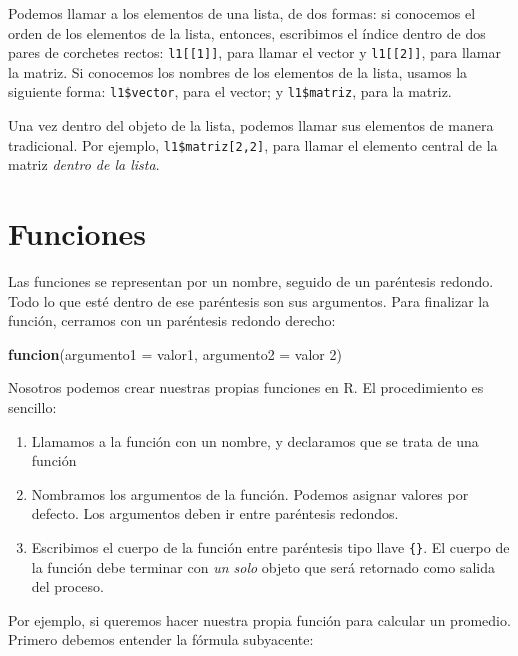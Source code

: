 \documentclass[12pt,letterpaper,]{book}
\newenvironment{Shaded}{\begin{snugshade}}{\end{snugshade}}
\newcommand{\KeywordTok}[1]{\textcolor[rgb]{0.13,0.29,0.53}{\textbf{#1}}}
\newcommand{\DataTypeTok}[1]{\textcolor[rgb]{0.13,0.29,0.53}{#1}}
\newcommand{\DecValTok}[1]{\textcolor[rgb]{0.00,0.00,0.81}{#1}}
\newcommand{\NormalTok}[1]{#1}
\begin{document}
Podemos llamar a los elementos de una lista, de dos formas: si conocemos
el orden de los elementos de la lista, entonces, escribimos el índice
dentro de dos pares de corchetes rectos: \texttt{l1{[}{[}1{]}{]}}, para
llamar el vector y \texttt{l1{[}{[}2{]}{]}}, para llamar la matriz. Si
conocemos los nombres de los elementos de la lista, usamos la siguiente
forma: \texttt{l1\$vector}, para el vector; y \texttt{l1\$matriz}, para
la matriz.

Una vez dentro del objeto de la lista, podemos llamar sus elementos de
manera tradicional. Por ejemplo, \texttt{l1\$matriz{[}2,2{]}}, para
llamar el elemento central de la matriz \emph{dentro de la lista}.

\section{Funciones}\label{funciones}

Las funciones se representan por un nombre, seguido de un paréntesis
redondo. Todo lo que esté dentro de ese paréntesis son sus argumentos.
Para finalizar la función, cerramos con un paréntesis redondo derecho:

\begin{Shaded}
\begin{Highlighting}[]
\KeywordTok{funcion}\NormalTok{(}\DataTypeTok{argumento1 =}\NormalTok{ valor1,  }\DataTypeTok{argumento2 =}\NormalTok{ valor }\DecValTok{2}\NormalTok{)}
\end{Highlighting}
\end{Shaded}

Nosotros podemos crear nuestras propias funciones en R. El procedimiento
es sencillo:

\begin{enumerate}
\def\labelenumi{\arabic{enumi}.}
\item
  Llamamos a la función con un nombre, y declaramos que se trata de una
  función
\item
  Nombramos los argumentos de la función. Podemos asignar valores por
  defecto. Los argumentos deben ir entre paréntesis redondos.
\item
  Escribimos el cuerpo de la función entre paréntesis tipo llave
  \texttt{\{\}}. El cuerpo de la función debe terminar con \emph{un
  solo} objeto que será retornado como salida del proceso.
\end{enumerate}

Por ejemplo, si queremos hacer nuestra propia función para calcular un
promedio. Primero debemos entender la fórmula subyacente:
\end{document}

